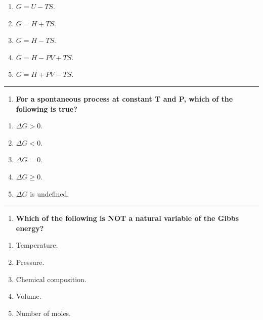 \documentclass[
  9pt,
]{extbook}
\providecommand{\tightlist}{%
  \setlength{\itemsep}{0pt}\setlength{\parskip}{0pt}}
\theoremstyle{definition}
\theoremstyle{definition}
\theoremstyle{definition}
\theoremstyle{definition}
\theoremstyle{remark}
\begin{document}
\begin{enumerate}
\def\labelenumi{\alph{enumi}.}
\tightlist
\item
  \(G = U - TS\).
\item
  \(G = H + TS\).
\item
  \(G = H - TS\).
\item
  \(G = H - PV + TS\).
\item
  \(G = H + PV - TS\).
\end{enumerate}

\begin{center}\rule{0.5\linewidth}{0.5pt}\end{center}

\begin{enumerate}
\def\labelenumi{\arabic{enumi}.}
\setcounter{enumi}{1}
\tightlist
\item
  \textbf{For a spontaneous process at constant T and P, which of the following is true?}
\end{enumerate}

\begin{enumerate}
\def\labelenumi{\alph{enumi}.}
\tightlist
\item
  \(\Delta G > 0\).
\item
  \(\Delta G < 0\).
\item
  \(\Delta G = 0\).
\item
  \(\Delta G \geq 0\).
\item
  \(\Delta G\) is undefined.
\end{enumerate}

\begin{center}\rule{0.5\linewidth}{0.5pt}\end{center}

\begin{enumerate}
\def\labelenumi{\arabic{enumi}.}
\setcounter{enumi}{2}
\tightlist
\item
  \textbf{Which of the following is NOT a natural variable of the Gibbs energy?}
\end{enumerate}

\begin{enumerate}
\def\labelenumi{\alph{enumi}.}
\tightlist
\item
  Temperature.
\item
  Pressure.
\item
  Chemical composition.
\item
  Volume.
\item
  Number of moles.
\end{enumerate}
\end{document}
